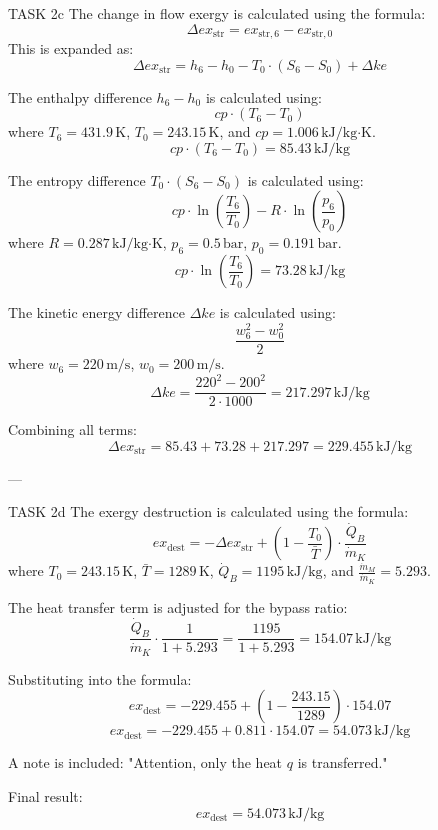 TASK 2c  
The change in flow exergy is calculated using the formula:  
\[
\Delta ex_{\text{str}} = ex_{\text{str},6} - ex_{\text{str},0}
\]  
This is expanded as:  
\[
\Delta ex_{\text{str}} = h_6 - h_0 - T_0 \cdot (S_6 - S_0) + \Delta ke
\]  

The enthalpy difference \( h_6 - h_0 \) is calculated using:  
\[
cp \cdot (T_6 - T_0)
\]  
where \( T_6 = 431.9 \, \text{K} \), \( T_0 = 243.15 \, \text{K} \), and \( cp = 1.006 \, \text{kJ/kg·K} \).  
\[
cp \cdot (T_6 - T_0) = 85.43 \, \text{kJ/kg}
\]  

The entropy difference \( T_0 \cdot (S_6 - S_0) \) is calculated using:  
\[
cp \cdot \ln\left(\frac{T_6}{T_0}\right) - R \cdot \ln\left(\frac{p_6}{p_0}\right)
\]  
where \( R = 0.287 \, \text{kJ/kg·K} \), \( p_6 = 0.5 \, \text{bar} \), \( p_0 = 0.191 \, \text{bar} \).  
\[
cp \cdot \ln\left(\frac{T_6}{T_0}\right) = 73.28 \, \text{kJ/kg}
\]  

The kinetic energy difference \( \Delta ke \) is calculated using:  
\[
\frac{w_6^2 - w_0^2}{2}
\]  
where \( w_6 = 220 \, \text{m/s} \), \( w_0 = 200 \, \text{m/s} \).  
\[
\Delta ke = \frac{220^2 - 200^2}{2 \cdot 1000} = 217.297 \, \text{kJ/kg}
\]  

Combining all terms:  
\[
\Delta ex_{\text{str}} = 85.43 + 73.28 + 217.297 = 229.455 \, \text{kJ/kg}
\]  

---

TASK 2d  
The exergy destruction is calculated using the formula:  
\[
ex_{\text{dest}} = -\Delta ex_{\text{str}} + \left(1 - \frac{T_0}{\bar{T}}\right) \cdot \frac{\dot{Q}_B}{\dot{m}_K}
\]  
where \( T_0 = 243.15 \, \text{K} \), \( \bar{T} = 1289 \, \text{K} \), \( \dot{Q}_B = 1195 \, \text{kJ/kg} \), and \( \frac{\dot{m}_M}{\dot{m}_K} = 5.293 \).  

The heat transfer term is adjusted for the bypass ratio:  
\[
\frac{\dot{Q}_B}{\dot{m}_K} \cdot \frac{1}{1 + 5.293} = \frac{1195}{1 + 5.293} = 154.07 \, \text{kJ/kg}
\]  

Substituting into the formula:  
\[
ex_{\text{dest}} = -229.455 + \left(1 - \frac{243.15}{1289}\right) \cdot 154.07
\]  
\[
ex_{\text{dest}} = -229.455 + 0.811 \cdot 154.07 = 54.073 \, \text{kJ/kg}
\]  

A note is included: "Attention, only the heat \( q \) is transferred."  

Final result:  
\[
ex_{\text{dest}} = 54.073 \, \text{kJ/kg}
\]